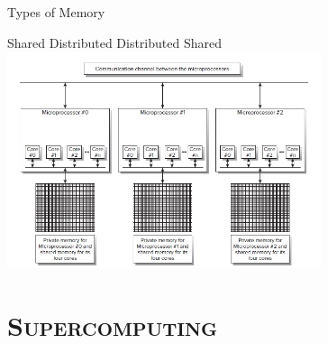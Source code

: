 \documentclass[xcolor=x11names,compress]{beamer}
\renewcommand{\(}{\begin{columns}}
\renewcommand{\)}{\end{columns}}
\newcommand{\<}[1]{\begin{column}{#1}}
\renewcommand{\>}{\end{column}}
\begin{document}
\begin{frame}{Types of Memory}

\begin{center}
Shared \hspace*{2 em} Distributed \hspace*{2 em} Distributed Shared
\includegraphics[height=2.5in,clip]{MemorySystems}
\end{center}

\end{frame}

\section{\scshape Supercomputing}
\end{document}
